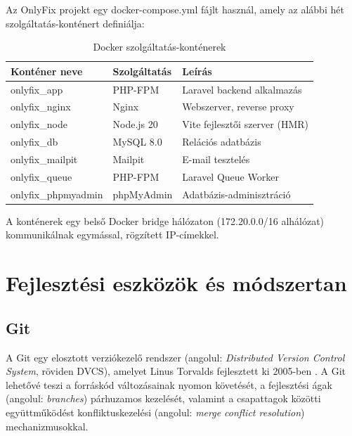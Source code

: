 \documentclass[colorlinks]{thesis-kando}
\begin{document}
Az OnlyFix projekt egy docker-compose.yml fájlt használ, amely az alábbi hét szolgáltatás-konténert definiálja:

\begin{table}[ht]
	\centering
	\begin{tabular}{lll}
		\hline
		\textbf{Konténer neve} & \textbf{Szolgáltatás} & \textbf{Leírás} \\ \hline
		onlyfix\_app & PHP-FPM & Laravel backend alkalmazás \\
		onlyfix\_nginx & Nginx & Webszerver, reverse proxy \\
		onlyfix\_node & Node.js 20 & Vite fejlesztői szerver (HMR) \\
		onlyfix\_db & MySQL 8.0 & Relációs adatbázis \\
		onlyfix\_mailpit & Mailpit & E-mail tesztelés \\
		onlyfix\_queue & PHP-FPM & Laravel Queue Worker \\
		onlyfix\_phpmyadmin & phpMyAdmin & Adatbázis-adminisztráció \\ \hline
	\end{tabular}
	\caption{Docker szolgáltatás-konténerek}
	\label{tab-docker}
\end{table}

A konténerek egy belső Docker bridge hálózaton (172.20.0.0/16 alhálózat) kommunikálnak egymással, rögzített IP-címekkel.

\chapter{Fejlesztési eszközök és módszertan}

\section{Git}

A Git egy elosztott verziókezelő rendszer (angolul: \emph{Distributed Version Control System}, röviden DVCS), amelyet Linus Torvalds fejlesztett ki 2005-ben \cite{ref20}. A Git lehetővé teszi a forráskód változásainak nyomon követését, a fejlesztési ágak (angolul: \emph{branches}) párhuzamos kezelését, valamint a csapattagok közötti együttműködést konfliktuskezelési (angolul: \emph{merge conflict resolution}) mechanizmusokkal.
\end{document}
